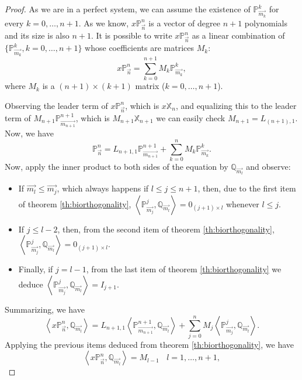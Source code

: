 \documentclass[12pt,a4]{article}
\theoremstyle{plain}
\newcommand{\prodesc}[2]{\left\langle #1 , #2 \right\rangle}
\begin{document}
\begin{proof}
    As we are in a perfect system, we can assume the existence of $\mathbb P_{\overrightarrow{m_k}}^k$ for every $k=0,\dots,n+1$. As we know, $x\mathbb P_{\vec n}^n$ is a vector of degree $n+1$ polynomials and its size is also $n+1$. It is possible to write  $x\mathbb P_{\vec n}^n$ as a linear combination of $\{\mathbb P_{\overrightarrow{m_k}}^k, k=0,\dots,n+1\}$ whose coefficients are matrices $M_k$:
    $$
    x\mathbb P_{\overrightarrow{n}}^n = \sum_{k=0}^{n+1} M_k \mathbb P_{\overrightarrow{m_k}}^k,
    $$
    where $M_k$ is a $(n+1)\times(k+1)$ matrix ($k=0,\dots,n+1$).

    Observing the leader term of $x\mathbb P_{\overrightarrow{n}}^n$, which is $x\mathbb X_{n}$, and equalizing this to the leader term of $M_{n+1} \mathbb P_{\overrightarrow{m_{n+1}}}^{n+1}$, which is $M_{n+1}\mathbb X_{n+1}$ we can easily check $M_{n+1}=L_{(n+1),1}$. Now, we have
    $$
    \mathbb P_{\overrightarrow{n}}^n = L_{n+1,1}\mathbb P_{\overrightarrow{m_{n+1}}}^{n+1} + \sum_{k=0}^{n} M_k \mathbb P_{\overrightarrow{m_k}}^k.
    $$
    Now, apply the inner product to both sides of the equation by $\mathbb Q_{\overrightarrow{m_l}}$ and observe:
    \begin{itemize}
        \item If $\overrightarrow{m_l}\leq \overrightarrow{m_j}$, which always happens if $l\leq j\leq n+1$, then, due to the first item of theorem \ref{th:biorthogonality}, $\prodesc{\mathbb P_{\overrightarrow{m_j}}^j}{\mathbb Q_{\overrightarrow{m_l}}} = 0_{(j+1)\times l}$ whenever $l\leq j$.
        \item If $j\leq l-2$, then, from the second item of theorem \ref{th:biorthogonality}, $\prodesc{\mathbb P_{\overrightarrow{m_j}}^j}{\mathbb Q_{\overrightarrow{m_l}}} = 0_{(j+1)\times l}.$
        \item Finally, if $j=l-1$, from the last item of theorem \ref{th:biorthogonality} we deduce $\prodesc{\mathbb P_{\overrightarrow{m_j}}^j}{\mathbb Q_{\overrightarrow{m_l}}} = I_{j+1}.$
    \end{itemize}

    Summarizing, we have
    $$
    \prodesc{x\mathbb P_{\vec n}^n}{\mathbb Q_{\overrightarrow{m_l}}} = L_{n+1,1}\prodesc{\mathbb P_{\overrightarrow{m_{n+1}}}^{n+1}}{\mathbb Q_{\overrightarrow{m_l}}} + \sum_{j=0}^n M_j \prodesc{\mathbb P_{\overrightarrow{m_j}}^j}{\mathbb Q_{\overrightarrow{m_l}}}.
    $$
    Applying the previous items deduced from theorem \ref{th:biorthogonality}, we have
    \begin{equation}
        \label{eq:biorthogonality-1}
        \prodesc{x\mathbb P_{\vec n}^n}{\mathbb Q_{\overrightarrow{m_l}}} = M_{l-1} \ \ \ \ l=1,\dots,n+1,
    \end{equation}


\end{proof}
\end{document}
